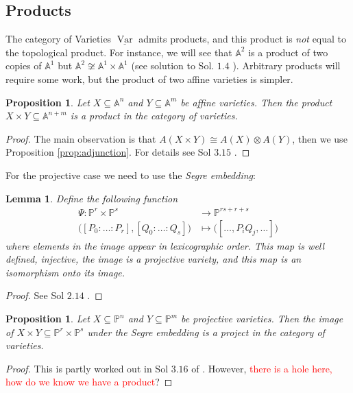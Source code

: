 \documentclass[12pt]{article}
\theoremstyle{plain}
\newtheorem{proposition}[thm]{Proposition}
\newtheorem{lemma}[thm]{Lemma}
\theoremstyle{definition}
\newcommand{\bb}[1]{\mathbb{#1}}
\newcommand{\lto}{\longrightarrow}
\begin{document}
\subsection{Products}
The category of Varieties $\underline{\operatorname{Var}}$ admits products, and this product is \emph{not} equal to the topological product. For instance, we will see that $\bb{A}^2$ is a product of two copies of $\bb{A}^1$ but $\bb{A}^2 \not\cong \bb{A}^1 \times \bb{A}^1$ (see solution to Sol. $1.4$ \cite{hartshorne_solutions}). Arbitrary products will require some work, but the product of two affine varieties is simpler.
\begin{proposition}\label{prop:prod_affine_variety}
Let $X \subseteq \bb{A}^n$ and $Y \subseteq \bb{A}^m$ be affine varieties. Then the product $X \times Y \subseteq \bb{A}^{n+m}$ is a product in the category of varieties.
\end{proposition}
\begin{proof}
The main observation is that $A(X \times Y) \cong A(X) \otimes A(Y)$, then we use Proposition \ref{prop:adjunction}. For details see Sol $3.15$ \cite{hartshorne_solutions}.
\end{proof}
For the projective case we need to use the \emph{Segre embedding}:
\begin{lemma}
Define the following function
\begin{align}
    \Psi: \bb{P}^r \times \bb{P}^s &\lto \bb{P}^{rs + r + s}\\
    \big([P_0:\hdots:P_r],[Q_0:\hdots:Q_s]\big) &\longmapsto \big([\hdots, P_iQ_j,\hdots]\big)
\end{align}
where elements in the image appear in lexicographic order. This map is well defined, injective, the image is a projective variety, and this map is an isomorphism onto its image.
\end{lemma}
\begin{proof}
See Sol $2.14$ \cite{hartshorne_solutions}.
\end{proof}
\begin{proposition}
Let $X \subseteq \bb{P}^n$ and $Y \subseteq \bb{P}^m$ be projective varieties. Then the image of $X \times Y \subseteq \bb{P}^r \times \bb{P}^s$ under the Segre embedding is a project in the category of varieties.
\end{proposition}
\begin{proof}
This is partly worked out in Sol $3.16$ of \cite{hartshorne_solutions}. However, \textcolor{red}{there is a hole here, how do we know we have a product}?
\end{proof}
\end{document}
